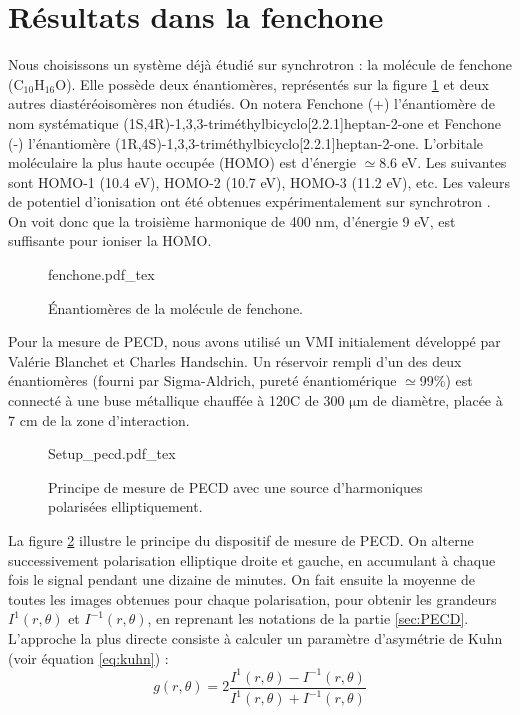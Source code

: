 \section{Résultats dans la fenchone}
\label{sec:results_fenchone}
Nous choisissons un système déjà étudié sur synchrotron : la molécule de fenchone ($\text{C}_{10}\text{H}_{16}\text{O}$). Elle possède deux énantiomères, représentés sur la figure \ref{fig:fenchone} et deux autres diastéréoisomères non étudiés. On notera Fenchone (+) l'énantiomère de nom systématique  (1S,4R)-1,3,3-triméthylbicyclo[2.2.1]heptan-2-one et Fenchone (-) l'énantiomère (1R,4S)-1,3,3-triméthylbicyclo[2.2.1]heptan-2-one. L'orbitale moléculaire la plus haute occupée (HOMO) est d'énergie $\simeq$8.6 eV. Les suivantes sont HOMO-1 (10.4 eV), HOMO-2 (10.7 eV), HOMO-3 (11.2 eV), etc. Les valeurs de potentiel d'ionisation ont été obtenues expérimentalement sur synchrotron . On voit donc que la troisième harmonique de 400 nm, d'énergie 9 eV, est suffisante pour ioniser la HOMO.

\begin{figure}[!ht]
\centering
\def\svgwidth{0.7\columnwidth}
{fenchone.pdf_tex}
\caption{\'{E}nantiomères de la molécule de fenchone.}
\label{fig:fenchone}
\end{figure}

Pour la mesure de PECD, nous avons utilisé un VMI initialement développé par Valérie Blanchet et Charles Handschin. Un réservoir rempli d'un des deux énantiomères (fourni par Sigma-Aldrich, pureté énantiomérique $\simeq$99\%) est connecté à une buse métallique chauffée à 120\degres C de 300 $\si{\micro\metre}$ de diamètre, placée à 7 cm de la zone d'interaction. 

\begin{figure}[!ht]
\centering
\def\svgwidth{0.8\columnwidth}
{Setup_pecd.pdf_tex}
\caption{Principe de mesure de PECD avec une source d'harmoniques polarisées elliptiquement.}
\label{fig:pecdsetup}
\end{figure}

La figure \ref{fig:pecdsetup} illustre le principe du dispositif de mesure de PECD. On alterne successivement polarisation elliptique droite et gauche, en accumulant à chaque fois le signal pendant une dizaine de minutes. On fait ensuite la moyenne de toutes les images obtenues pour chaque polarisation, pour obtenir les grandeurs $I^{1}(r,\theta)$ et $I^{-1}(r,\theta)$, en reprenant les notations de la partie \ref{sec:PECD}. L'approche la plus directe consiste à calculer un paramètre d'asymétrie de Kuhn (voir équation \ref{eq:kuhn}) :
\begin{equation}
g(r,\theta) = 2\frac{I^{1}(r,\theta)-I^{-1}(r,\theta)}{I^{1}(r,\theta)+I^{-1}(r,\theta)}
\end{equation}

